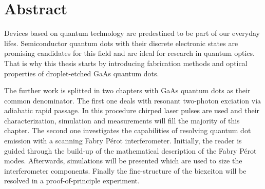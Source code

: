 

\chapter*{Abstract}
\label{cha:abstract}


Devices based on quantum technology are predestined to be part of our everyday lifes.
Semiconductor quantum dots with their discrete electronic states are promising candidates for this field and are ideal for research in quantum optics.
That is why this thesis starts by introducing fabrication methods and optical properties of droplet-etched GaAs quantum dots.  

The further work is splitted in two chapters with GaAs quantum dots as their common denominator.
The first one deals with resonant two-photon exciation via adiabatic rapid passage.
In this procedure chirped laser pulses are used and their characterization, simulation and measurements will fill the majority of this chapter.
The second one investigates the capabilities of resolving quantum dot emission with a scanning Fabry Pérot interferometer.
Initially, the reader is guided through the build-up of the mathematical description of the Fabry Pérot modes.
Afterwards, simulations will be presented which are used to size the interferometer components.
Finally the fine-structure of the biexciton will be resolved in a proof-of-principle experiment.

